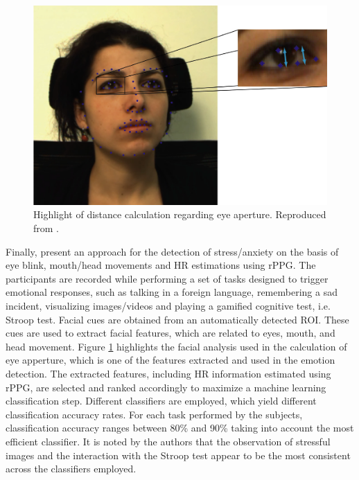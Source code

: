 \begin{figure}[h]
    \centering
    \includegraphics[width=0.7\linewidth]{Content/figures/giannakakis2017stress-eye.png}
    \caption{Highlight of distance calculation regarding eye aperture. Reproduced from \textcite{giannakakis2017stress}.}
    \label{fig:giannakakis2017stress-eye}
\end{figure}

Finally, \textcite{giannakakis2017stress} present an approach for the detection of stress/anxiety on the basis of eye blink, mouth/head movements and HR estimations using rPPG. The participants are recorded while performing a set of tasks designed to trigger emotional responses, such as talking in a foreign language, remembering a sad incident, visualizing images/videos and playing a gamified cognitive test, i.e. Stroop test. Facial cues are obtained from an automatically detected ROI. These cues are used to extract facial features, which are related to eyes, mouth, and head movement. Figure \ref{fig:giannakakis2017stress-eye} highlights the facial analysis used in the calculation of eye apperture, which is one of the features extracted and used in the emotion detection. The extracted features, including HR information estimated using rPPG, are selected and ranked accordingly to maximize a machine learning classification step. Different classifiers are employed, which yield different classification accuracy rates. For each task performed by the subjects, classification accuracy ranges between 80\% and 90\% taking into account the most efficient classifier. It is noted by the authors that the observation of stressful images and the interaction with the Stroop test appear to be the most consistent across the classifiers employed.
